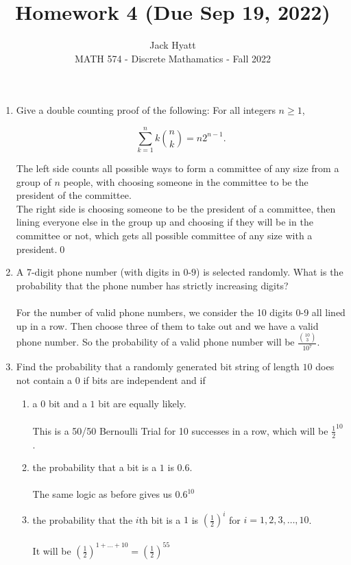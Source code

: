 \documentclass[12pt]{article}
\begin{document}

\title{Homework 4 (Due Sep 19, 2022)}%
\author{Jack Hyatt\\ %
	MATH 574 - Discrete Mathamatics - Fall 2022} %

\maketitle

\noindent

\medskip 

\begin{enumerate}


\item Give a double counting proof of the following: For all integers $n \geq 1$, 

\[\sum_{k=1}^n k {n \choose k} = n2^{n-1}.\]

The left side counts all possible ways to form a committee of any size from a group of $n$ people, with choosing someone in the committee to be the president of the committee.\medskip\\
The right side is choosing someone to be the president of a committee, then lining everyone else in the group up and choosing if they will be in the committee or not, which gets all possible committee of any size with a president.\qed

\medskip 

\item A 7-digit phone number (with digits in $0$-$9$) is selected randomly. What is the probability that the phone number has strictly increasing digits?\\\\
For the number of valid phone numbers, we consider the 10 digits 0-9 all lined up in a row. Then choose three of them to take out and we have a valid phone number. So the probability of a valid phone number will be $\frac{\binom{10}{3}}{10^7}$.

\medskip


\item Find the probability that a randomly generated bit string
of length $10$ does not contain a $0$ if bits are independent
and if
\begin{enumerate}
\item a $0$ bit and a $1$ bit are equally likely.\\\\
This is a 50/50 Bernoulli Trial for 10 successes in a row, which will be $\frac{1}{2}^{10}$.
\item the probability that a bit is a $1$ is $0.6$.\\\\
The same logic as before gives us $0.6^{10}$
\item the probability that the $i$th bit is a $1$ is $(\frac{1}{2})^i$ for $i =
1, 2, 3,\ldots, 10$.\\\\
It will be $(\frac{1}{2})^{1+\ldots+10} = (\frac{1}{2})^{55}$
\end{enumerate}


\end{enumerate}
\end{document}
